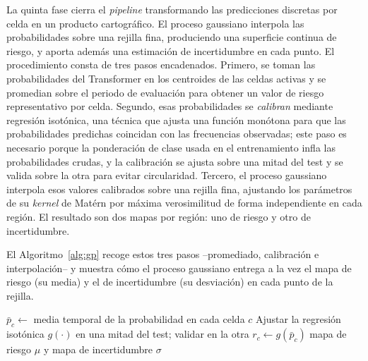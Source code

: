 La quinta fase cierra el \textit{pipeline} transformando las predicciones discretas por celda
en un producto cartográfico. El proceso gaussiano interpola las probabilidades sobre una
rejilla fina, produciendo una superficie continua de riesgo, y aporta además una estimación de
incertidumbre en cada punto. El procedimiento consta de tres pasos encadenados. Primero, se
toman las probabilidades del Transformer en los centroides de las celdas activas y se promedian
sobre el periodo de evaluación para obtener un valor de riesgo representativo por celda.
Segundo, esas probabilidades se \emph{calibran} mediante regresión isotónica, una técnica que
ajusta una función monótona para que las probabilidades predichas coincidan con las frecuencias
observadas; este paso es necesario porque la ponderación de clase usada en el entrenamiento
infla las probabilidades crudas, y la calibración se ajusta sobre una mitad del test y se valida
sobre la otra para evitar circularidad. Tercero, el proceso gaussiano interpola esos valores
calibrados sobre una rejilla fina, ajustando los parámetros de su \textit{kernel} de Matérn por
máxima verosimilitud de forma independiente en cada región. El resultado son dos mapas por
región: uno de riesgo y otro de
incertidumbre.

El Algoritmo~\ref{alg:gp} recoge estos tres pasos --promediado, calibración e interpolación--
y muestra cómo el proceso gaussiano entrega a la vez el mapa de riesgo (su media) y el de
incertidumbre (su desviación) en cada punto de la rejilla.

\begin{algorithm}[ht!]
  \caption{Cartografía del riesgo con calibración y Proceso Gaussiano}
  \label{alg:gp}
  \DontPrintSemicolon
  $\bar{p}_c \leftarrow$ media temporal de la probabilidad en cada celda $c$ 
  Ajustar la regresión isotónica $g(\cdot)$ en una mitad del test; validar en la otra\;
  $r_c \leftarrow g(\bar{p}_c)$ 
  \Return mapa de riesgo $\mu$ y mapa de incertidumbre $\sigma$\;
\end{algorithm}

